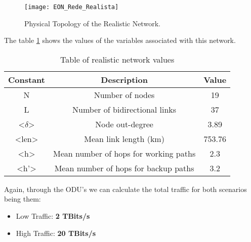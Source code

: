 \begin{figure}[h!]
\centering
\texttt{[image: EON\_Rede\_Realista]}
\caption{Physical Topology of the Realistic Network.}
\end{figure}

The table \ref{table:4} shows the values of the variables associated with this network.
\begin{table}[h!]
\centering
\begin{tabular}{|| c | c | c||}
 \hline
 Constant & Description & Value \\
 \hline\hline
 N & Number of nodes & 19 \\
 L & Number of bidirectional links & 37 \\
 <$\delta$> & Node out-degree & 3.89 \\
 <len> & Mean link length (km) & 753.76 \\
 <h> & Mean number of hops for working paths & 2.3 \\
 <h'> & Mean number of hops for backup paths & 3.2 \\
 \hline
\end{tabular}
\caption{Table of realistic network values}
\label{table:4}
\end{table}

Again, through the ODU's we can calculate the total traffic for both scenarios being them:
\begin{itemize}
  \item Low Traffic: \textbf{2 TBits/s}
  \item High Traffic: \textbf{20 TBits/s}
\end{itemize}


